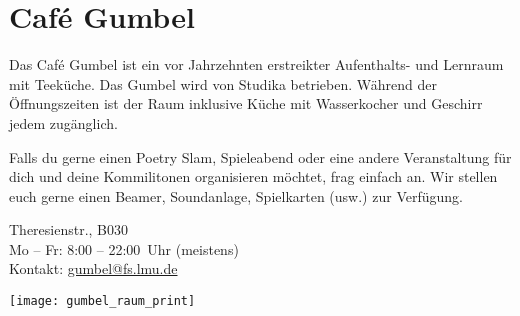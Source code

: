 ﻿
\section{Café Gumbel}

Das Café Gumbel ist ein vor Jahrzehnten erstreikter Aufenthalts- und Lernraum mit Teeküche.  Das Gumbel wird von Studika betrieben.  Während der
Öffnungszeiten ist der Raum inklusive Küche mit Wasserkocher und Geschirr
jedem zugänglich.

Falls du gerne einen Poetry Slam, Spieleabend oder
eine andere Veranstaltung für dich und deine Kommilitonen organisieren
möchtet, frag einfach an.  Wir stellen euch gerne einen Beamer, Soundanlage,
Spielkarten (usw.) zur Verfügung.

Theresienstr., B030\\
Mo -- Fr: 8:00 -- 22:00~Uhr (meistens)\\
Kontakt: \url{gumbel@fs.lmu.de}

\skiptobottom
\texttt{[image: gumbel\_raum\_print]}
